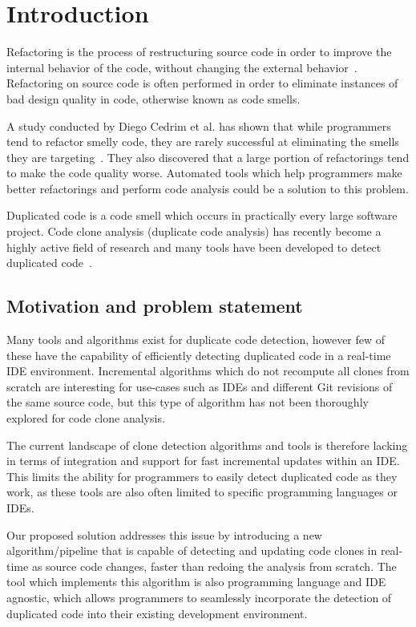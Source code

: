 \chapter{Introduction}

Refactoring is the process of restructuring source code in order to improve the internal behavior
of the code, without changing the external behavior~\cite[9]{fowlerrefactoring}.
Refactoring on source code is often performed in order to eliminate instances of bad
design quality in code, otherwise known as code smells.

A study conducted by Diego Cedrim et al. has shown that while programmers tend to refactor
smelly code, they are rarely successful at eliminating the smells they are
targeting~\cite{Rohit_Gheyi_Impact}. They also discovered that a large portion of
refactorings tend to make the code quality worse. Automated tools which help programmers
make better refactorings and perform code analysis could be a solution to this problem.

Duplicated code is a code smell which occurs in practically every large software project.
Code clone analysis (duplicate code analysis) has recently become a highly active field
of research and many tools have been developed to detect duplicated
code~\cite[7]{Inoue_introduction_to_cc}. 

\section{Motivation and problem statement}

Many tools and algorithms exist for duplicate code detection, however few of these have
the capability of efficiently detecting duplicated code in a real-time IDE environment.
Incremental algorithms which do not recompute all clones from scratch are interesting for
use-cases such as IDEs and different Git revisions of the same source code, but this type of
algorithm has not been thoroughly explored for code clone analysis.

The current landscape of clone detection algorithms and tools is therefore lacking in
terms of integration and support for fast incremental updates within an IDE. This limits
the ability for programmers to easily detect duplicated code as they work, as these tools
are also often limited to specific programming languages or IDEs.

Our proposed solution addresses this issue by introducing a new algorithm/pipeline that is
capable of detecting and updating code clones in real-time as source code changes, faster
than redoing the analysis from scratch. The tool which implements this algorithm is also
programming language and IDE agnostic, which allows programmers to seamlessly incorporate
the detection of duplicated code into their existing development environment.

